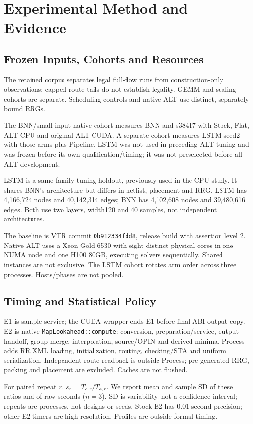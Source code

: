 \section{Experimental Method and Evidence}
\subsection{Frozen Inputs, Cohorts and Resources}
The retained corpus separates legal full-flow runs from construction-only observations; capped route tails do not establish legality. GEMM and scaling cohorts are separate. Scheduling controls and native ALT use distinct, separately bound RRGs.

The BNN/small-input native cohort measures BNN and s38417 with Stock, Flat, ALT CPU and original ALT CUDA. A separate cohort measures LSTM seed2 with those arms plus Pipeline. LSTM was not used in preceding ALT tuning and was frozen before its own qualification/timing; it was not preselected before all ALT development.

LSTM is a same-family tuning holdout, previously used in the CPU study. It shares BNN's architecture but differs in netlist, placement and RRG. LSTM has 4,166,724 nodes and 40,142,314 edges; BNN has 4,102,608 nodes and 39,480,616 edges. Both use two layers, width120 and 40 samples, not independent architectures.

The baseline is VTR commit \texttt{0b912334fdd8}, release build with assertion level 2. Native ALT uses a Xeon Gold 6530 with eight distinct physical cores in one NUMA node and one H100 80GB, executing solvers sequentially. Shared instances are not exclusive. The LSTM cohort rotates arm order across three processes. Hosts/phases are not pooled.

\subsection{Timing and Statistical Policy}
E1 is sample service; the CUDA wrapper ends E1 before final ABI output copy. E2 is native \texttt{MapLookahead::compute}: conversion, preparation/service, output handoff, group merge, interpolation, source/OPIN and derived minima. Process adds RR XML loading, initialization, routing, checking/STA and uniform serialization. Independent route readback is outside Process; pre-generated RRG, packing and placement are excluded. Caches are not flushed.

For paired repeat $r$, $s_r=T_{c,r}/T_{a,r}$. We report mean and sample SD of these ratios and of raw seconds ($n=3$). SD is variability, not a confidence interval; repeats are processes, not designs or seeds. Stock E2 has 0.01-second precision; other E2 timers are high resolution. Profiles are outside formal timing.

